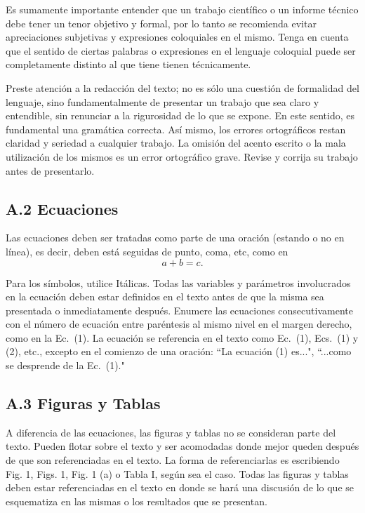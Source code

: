 \documentclass[a4paper, 10pt, conference]{ieeeconf}      %
\begin{document}
Es sumamente importante entender que un trabajo cien\-t\'ifico o un informe t\'ecnico debe tener un tenor objetivo y formal, por lo tanto se recomienda evitar apreciaciones subjetivas y expresiones coloquiales en el mismo. Tenga en cuenta que el sentido de ciertas palabras o expresiones en el lenguaje coloquial puede ser completamente distinto al que tiene tienen t\'ecnicamente. 

Preste atenci\'on a la redacci\'on del texto; no es s\'olo una cuesti\'on de formalidad del lenguaje, sino fundamentalmente de presentar un trabajo que sea claro y entendible, sin renunciar a la rigurosidad de lo que se expone. En este sentido, es fundamental una gram\'atica correcta. As\'i mismo, los errores ortogr\'aficos restan claridad y seriedad a cualquier trabajo. La omisi\'on del acento escrito o la mala utilizaci\'on de los mismos es un error ortogr\'afico grave. Revise y corrija su trabajo antes de presentarlo.

\subsection*{A.2		Ecuaciones}

Las ecuaciones deben ser tratadas como parte de una oraci\'on (estando o no en l\'inea), es decir, deben est\'a seguidas de punto, coma, etc, como en
\begin{equation}
     a + b = c.
\end{equation}\label{ec:ejemplo}

Para los s\'imbolos, utilice It\'alicas. Todas las variables y par\'ametros involucrados en la ecuaci\'on deben estar definidos en el texto antes de que la misma sea presentada o inmediatamente despu\'es. Enumere las ecuaciones consecutivamente con el n\'umero de ecuaci\'on entre par\'entesis al mismo nivel en el margen derecho, como en la Ec.~(1). La ecuaci\'on se referencia en el texto como Ec.~(1), Ecs.~(1) y (2), etc., excepto en el comienzo de una oraci\'on: ``La ecuaci\'on (1) es...", ``...como se desprende de la Ec.~(1)."


 \subsection*{A.3		Figuras y Tablas}

A diferencia de las ecuaciones, las figuras y tablas no se consideran parte del texto. Pueden flotar sobre el texto y ser acomodadas donde mejor queden despu\'es de que son referenciadas en el texto. La forma de referenciarlas es escribiendo Fig. 1, Figs. 1, Fig. 1 (a) o Tabla I, seg\'un sea el caso. Todas las figuras y tablas deben estar referenciadas en el texto en donde se har\'a una discusi\'on de lo que se esquematiza en las mismas o los resultados que se presentan. 
\end{document}
